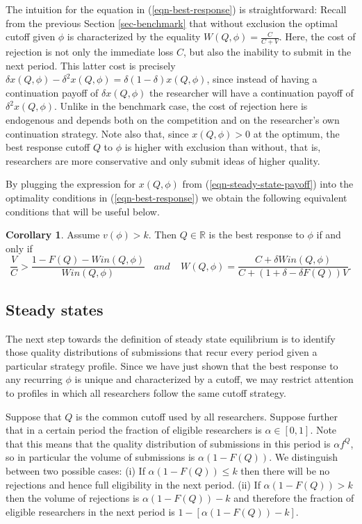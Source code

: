 \documentclass[12pt]{article}
\theoremstyle{plain}
\theoremstyle{definition}
\newtheorem{corollary}{Corollary}
\theoremstyle{remark}
\def\RR{\mathbb{R}}
\begin{document}
The intuition for the equation in (\ref{eqn-best-response}) is straightforward: Recall from the previous Section \ref{sec-benchmark} that without exclusion the optimal cutoff given $\phi$ is characterized by the equality $W(Q,\phi)= \frac{C}{C+V}$. Here, the cost of rejection is not only the immediate loss $C$, but also the inability to submit in the next period. This latter cost is precisely $\delta x(Q,\phi)-\delta^2 x(Q,\phi) = \delta(1-\delta)x(Q,\phi)$, since instead of having a continuation payoff of $\delta x(Q,\phi)$ the researcher will have a continuation payoff of $\delta^2 x(Q,\phi)$. Unlike in the benchmark case, the cost of rejection here is endogenous and depends both on the competition and on the researcher's own continuation strategy. Note also that, since $x(Q,\phi)>0$ at the optimum, the best response cutoff $Q$ to $\phi$ is higher with exclusion than without, that is, researchers are more conservative and only submit ideas of higher quality.   

By plugging the expression for $x(Q,\phi)$ from (\ref{eqn-steady-state-payoff}) into the optimality conditions in (\ref{eqn-best-response}) we obtain the following equivalent conditions that will be useful below.

\begin{corollary}\label{coro-best-response}
     Assume $v(\phi)> k$. Then $Q\in \RR$ is the best response to $\phi$ if and only if
    \begin{equation}\label{eqn-best-response-alt}
      \frac{V}{C} > \frac{1-F(Q)-Win(Q,\phi)}{Win(Q,\phi)} ~~~~\textit{and}~~~~~  W(Q,\phi)= \frac{C+\delta Win(Q,\phi)}{C+(1+\delta-\delta F(Q))V}.
    \end{equation}
\end{corollary}

\subsection{Steady states}

The next step towards the definition of steady state equilibrium is to identify those quality distributions of submissions that recur every period given a particular strategy profile. Since we have just shown that the best response to any recurring $\phi$ is unique and characterized by a cutoff, we may restrict attention to profiles in which all researchers follow the same cutoff strategy.

Suppose that $Q$ is the common cutoff used by all researchers. Suppose further that in a certain period the fraction of eligible researchers is $\alpha\in [0,1]$. Note that this means that the quality distribution of submissions in this period is $\alpha f^Q$, so in particular the volume of submissions is $\alpha(1-F(Q))$. We distinguish between two possible cases: (i) If $\alpha(1-F(Q))\le k$ then there will be no rejections and hence full eligibility in the next period. (ii) If $\alpha(1-F(Q))> k$ then the volume of rejections is $\alpha(1-F(Q))- k$ and therefore the fraction of eligible researchers in the next period is $1-[\alpha(1-F(Q))- k]$. 
\end{document}
